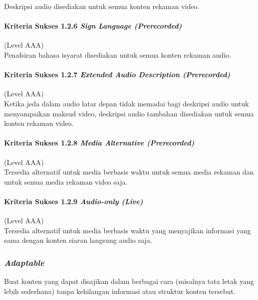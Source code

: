 Deskripsi audio disediakan untuk semua konten rekaman video.

\paragraph{Kriteria Sukses 1.2.6 \textit{Sign Language (Prerecorded)}}
\label{sec:kriteria_sukses_1.2.6}
(Level AAA)\\

Penafsiran bahasa isyarat disediakan untuk semua konten rekaman audio. 

\paragraph{Kriteria Sukses 1.2.7 \textit{Extended Audio Description (Prerecorded)}}
\label{sec:kriteria_sukses_1.2.7}
(Level AAA)\\

Ketika jeda dalam audio latar depan tidak memadai bagi deskripsi audio untuk menyampaikan maksud video, deskripsi audio tambahan disediakan untuk semua konten rekaman video.

\paragraph{Kriteria Sukses 1.2.8 \textit{Media Alternative (Prerecorded)}}
\label{sec:kriteria_sukses_1.2.8}
(Level AAA)\\

Tersedia alternatif untuk media berbasis waktu untuk semua media rekaman dan untuk semua media rekaman video saja.

\paragraph{Kriteria Sukses 1.2.9 \textit{Audio-only (Live)}}
\label{sec:kriteria_sukses_1.2.9}
(Level AAA)\\

Tersedia alternatif untuk media berbasis waktu yang menyajikan informasi yang sama dengan konten siaran langsung audio saja.

\subsubsection{\textit{Adaptable}}
\label{sec:adaptable}
Buat konten yang dapat disajikan dalam berbagai cara (misalnya tata letak yang lebih sederhana) tanpa kehilangan informasi atau struktur konten tersebut.

